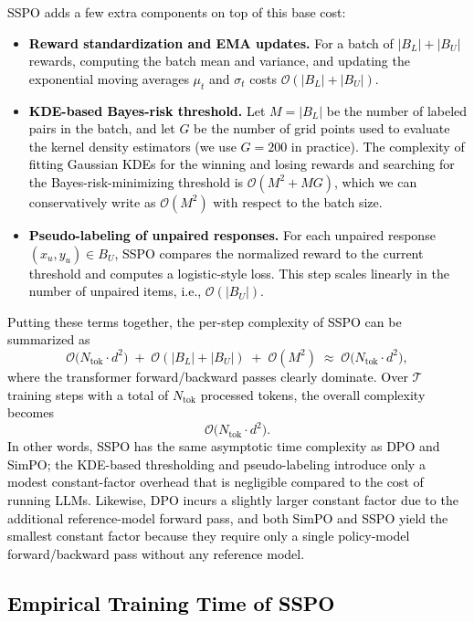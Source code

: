 \documentclass{article} %
\newcommand\rebuttal[1]{\textcolor{black}{#1}}
\begin{document}
\rebuttal{SSPO adds a few extra components on top of this base cost:}
\begin{itemize}
    \item \rebuttal{\textbf{Reward standardization and EMA updates.} For a batch of $|B_L| + |B_U|$ rewards, computing the batch mean and variance, and updating the exponential moving averages $\mu_t$ and $\sigma_t$ costs $\mathcal{O}(|B_L| + |B_U|)$.}
    \item \rebuttal{\textbf{KDE-based Bayes-risk threshold.} Let $M = |B_L|$ be the number of labeled pairs in the batch, and let $G$ be the number of grid points used to evaluate the kernel density estimators (we use $G=200$ in practice). The complexity of fitting Gaussian KDEs for the winning and losing rewards and searching for the Bayes-risk-minimizing threshold is $\mathcal{O}(M^2 + M G)$, which we can conservatively write as $\mathcal{O}(M^2)$ with respect to the batch size.}
    \item \rebuttal{\textbf{Pseudo-labeling of unpaired responses.} For each unpaired response $(x_u, y_u) \in B_U$, SSPO compares the normalized reward to the current threshold and computes a logistic-style loss. This step scales linearly in the number of unpaired items, i.e., $\mathcal{O}(|B_U|)$.}
\end{itemize}

\rebuttal{Putting these terms together, the per-step complexity of SSPO can be summarized as
\[
\mathcal{O}\big(N_{\text{tok}} \cdot d^2\big)
\;+\;
\mathcal{O}(|B_L| + |B_U|)
\;+\;
\mathcal{O}(M^2)
\;\approx\;
\mathcal{O}\big(N_{\text{tok}} \cdot d^2\big),
\]
where the transformer forward/backward passes clearly dominate. Over $\mathcal{T}$ training steps with a total of $N_{\text{tok}}$ processed tokens, the overall complexity becomes
\[
\mathcal{O}\big(N_{\text{tok}} \cdot d^2\big).
\]
In other words, SSPO has the same asymptotic time complexity as DPO and SimPO; the KDE-based thresholding and pseudo-labeling introduce only a modest constant-factor overhead that is negligible compared to the cost of running LLMs. Likewise, DPO incurs a slightly larger constant factor due to the additional reference-model forward pass, and both SimPO and SSPO yield the smallest constant factor because they require only a single policy-model forward/backward pass without any reference model.}

\subsection{\rebuttal{Empirical Training Time of SSPO}}
\label{appendix:sspo_wallclock}
\end{document}
